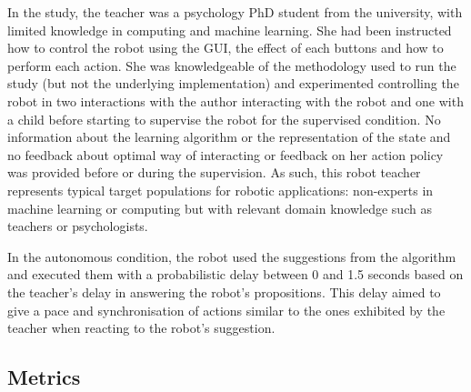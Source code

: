 In the study, the teacher was a psychology PhD student from the university, with limited knowledge in computing and machine learning. She had been instructed how to control the robot using the GUI, the effect of each buttons and how to perform each action. She was knowledgeable of the methodology used to run the study (but not the underlying implementation) and experimented controlling the robot in two interactions with the author interacting with the robot and one with a child before starting to supervise the robot for the supervised condition. No information about the learning algorithm or the representation of the state and no feedback about optimal way of interacting or feedback on her action policy was provided before or during the supervision. As such, this robot teacher represents typical target populations for robotic applications: non-experts in machine learning or computing but with relevant domain knowledge such as teachers or psychologists.

In the autonomous condition, the robot used the suggestions from the algorithm and executed them with a probabilistic delay between 0 and 1.5 seconds based on the teacher's delay in answering the robot's propositions. This delay aimed to give a pace and synchronisation of actions similar to the ones exhibited by the teacher when reacting to the robot's suggestion.


\subsection{Metrics}


